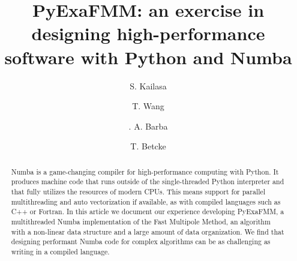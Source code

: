 \documentclass{IEEEcsmag}
\begin{document}

\title{PyExaFMM: an exercise in designing high-performance software with Python and Numba}

\author{S. Kailasa}

\author{T. Wang}

\author{. A. Barba}

\author{T. Betcke}


\begin{abstract}
   Numba is a game-changing compiler for high-performance computing with Python. It produces machine code that runs outside of the single-threaded Python interpreter and that fully utilizes the resources of modern CPUs. This means support for parallel multithreading and auto vectorization if available, as with compiled languages such as C++ or Fortran. In this article we document our experience developing PyExaFMM, a multithreaded Numba implementation of the Fast Multipole Method, an algorithm with a non-linear data structure and a large amount of data organization. We find that designing performant Numba code for complex algorithms can be as challenging as writing in a compiled language.
\end{abstract}
\end{document}
